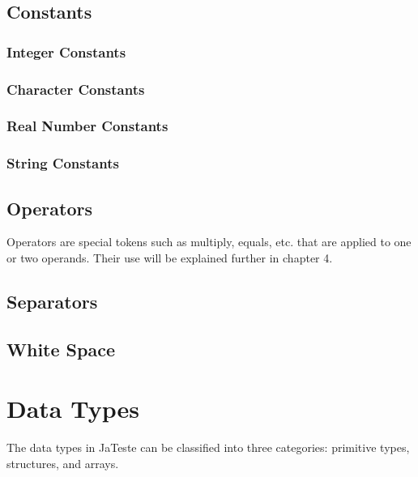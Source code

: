 \documentclass{article}
\begin{document}
\subsection{Constants}

\subsubsection{Integer Constants}

\subsubsection{Character Constants}

\subsubsection{Real Number Constants}

\subsubsection{String Constants}

\subsection{Operators}
Operators are special tokens such as multiply, equals, etc. that are applied to one or two operands.  Their use will be explained further in chapter 4.

\subsection{Separators}

\subsection{White Space}

\section{Data Types}
The data types in JaTeste can be classified into three categories: primitive types, structures, and arrays.
\end{document}
